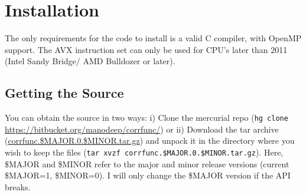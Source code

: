\documentclass[12pt,titlepage,justified]{article}
\begin{document}

\section{Installation}
The only requirements for the code to install is a valid C compiler, with OpenMP support. The AVX
instruction set can only be used for CPU's later than 2011 (Intel Sandy Bridge/ AMD Bulldozer or later). 

\subsection{Getting the Source}
You can obtain the source in two ways: i) Clone the mercurial repo (\texttt{hg clone} \url{https://bitbucket.org/manodeep/corrfunc/}) 
or ii) Download the tar archive (\href{https://bitbucket.org/manodeep/corrfunc/downloads/corrfunc.1.0.0.tar.gz}{corrfunc.\$MAJOR.0.\$MINOR.tar.gz}) and 
unpack it in the directory where you wish to keep the files (\texttt{tar xvzf corrfunc.\$MAJOR.0.\$MINOR.tar.gz}). Here, \$MAJOR and \$MINOR
refer to the major and minor release versions (current \$MAJOR=1, \$MINOR=0). I will only change the \$MAJOR version if the API breaks. 
\end{document}
